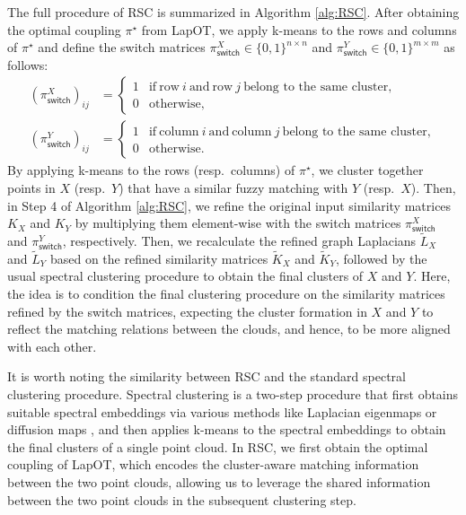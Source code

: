 \documentclass{article}
\theoremstyle{definition}
\begin{document}
The full procedure of RSC is summarized in Algorithm \ref{alg:RSC}. After obtaining the optimal coupling $\pi^\star$ from LapOT, we apply k-means to the rows and columns of $\pi^\star$ and define the switch matrices $\pi^X_{\mathsf{switch}} \in \{0, 1\}^{n \times n}$ and $\pi^Y_{\mathsf{switch}} \in \{0, 1\}^{m \times m}$ as follows:
\begin{align}
    (\pi^X_{\mathsf{switch}})_{i j} & = \begin{cases}
    1 & \text{if} ~ \text{row} ~ i ~ \text{and} ~ \text{row} ~ j ~ \text{belong to the same cluster}, \\
    0 & \text{otherwise},
    \end{cases} \label{eq:switch_X} \\
    (\pi^Y_{\mathsf{switch}})_{ij} & = \begin{cases}
    1 & \text{if} ~ \text{column} ~ i ~ \text{and} ~ \text{column} ~ j ~ \text{belong to the same cluster}, \\
    0 & \text{otherwise}.
    \end{cases} \label{eq:switch_Y}
\end{align}
By applying k-means to the rows (resp.\ columns) of $\pi^\star$, we cluster together points in $X$ (resp.\ $Y$) that have a similar fuzzy matching with $Y$ (resp.\ $X$). Then, in Step 4 of Algorithm \ref{alg:RSC}, we refine the original input similarity matrices $K_X$ and $K_Y$ by multiplying them element-wise with the switch matrices $\pi^X_{\mathsf{switch}}$ and $\pi^Y_{\mathsf{switch}}$, respectively. Then, we recalculate the refined graph Laplacians $\tilde{L}_X$ and $\tilde{L}_Y$ based on the refined similarity matrices $\tilde{K}_X$ and $\tilde{K}_Y$, followed by the usual spectral clustering procedure to obtain the final clusters of $X$ and $Y$. Here, the idea is to condition the final clustering procedure on the similarity matrices refined by the switch matrices, expecting the cluster formation in $X$ and $Y$ to reflect the matching relations between the clouds, and hence, to be more aligned with each other. 

It is worth noting the similarity between RSC and the standard spectral clustering procedure. Spectral clustering is a two-step procedure that first obtains suitable spectral embeddings via various methods like Laplacian eigenmaps \cite{belkin2001laplacian} or diffusion maps \cite{coifman2006diffusion}, and then applies k-means to the spectral embeddings to obtain the final clusters of a single point cloud. In RSC, we first obtain the optimal coupling of LapOT, which encodes the cluster-aware matching information between the two point clouds, allowing us to leverage the shared information between the two point clouds in the subsequent clustering step. 
\end{document}
